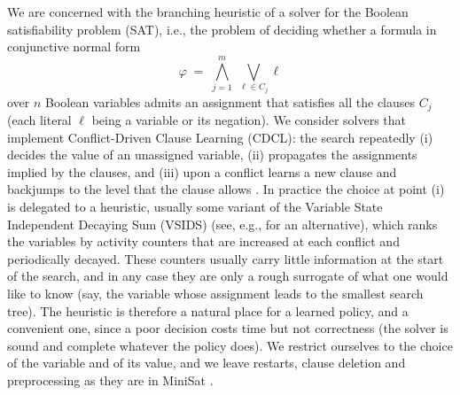 \documentclass[11pt,a4paper]{article}
\begin{document}
We are concerned with the branching heuristic of a solver for the Boolean
satisfiability problem (SAT), i.e., the problem of deciding whether a formula in
conjunctive normal form
\begin{equation}\label{eq:cnf}
  \varphi \;=\; \bigwedge_{j=1}^{m} \; \bigvee_{\ell \in C_j} \ell
\end{equation}
over $n$ Boolean variables admits an assignment that satisfies all the clauses
$C_j$ (each literal $\ell$ being a variable or its negation). We consider
solvers that implement Conflict-Driven Clause Learning (CDCL): the search
repeatedly (i) decides the value of an unassigned variable, (ii) propagates the
assignments implied by the clauses, and (iii) upon a conflict learns a new
clause and backjumps to the level that the clause allows
\cite{MarquesSilva1999,MarquesSilva2021}. In practice the choice at point (i)
is delegated to a heuristic, usually some variant of the Variable State Independent Decaying
Sum (VSIDS) \cite{Moskewicz2001} (see, e.g., \cite{Liang2016} for an
alternative), which ranks the variables by activity counters that are increased
at each conflict and periodically decayed. These counters usually carry little
information at the start of the search, and in any case they are only a rough
surrogate of what one would like to know (say, the variable whose assignment
leads to the smallest search tree). The heuristic is therefore a natural place for a learned
policy, and a convenient one, since a poor decision costs time but not
correctness (the solver is sound and complete whatever the policy does). We
restrict ourselves to the choice of the variable and of its value, and we leave
restarts, clause deletion and preprocessing as they are in MiniSat
\cite{EenSorensson2003}.
\end{document}
